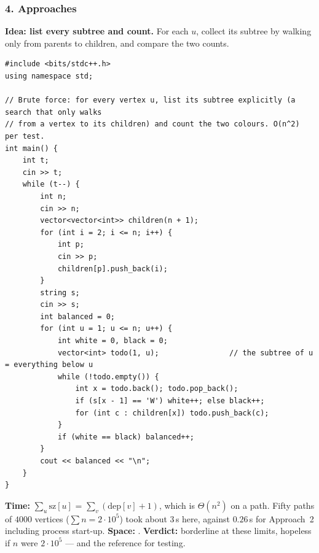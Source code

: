 \subsubsection*{4. Approaches}

\begin{bruteforcebox}
\textbf{Idea: list every subtree and count.} For each $u$, collect its subtree by walking only from parents to children, and compare the two counts.

\begin{lstlisting}[style=cpp]
#include <bits/stdc++.h>
using namespace std;

// Brute force: for every vertex u, list its subtree explicitly (a search that only walks
// from a vertex to its children) and count the two colours. O(n^2) per test.
int main() {
    int t;
    cin >> t;
    while (t--) {
        int n;
        cin >> n;
        vector<vector<int>> children(n + 1);
        for (int i = 2; i <= n; i++) {
            int p;
            cin >> p;
            children[p].push_back(i);
        }
        string s;
        cin >> s;
        int balanced = 0;
        for (int u = 1; u <= n; u++) {
            int white = 0, black = 0;
            vector<int> todo(1, u);                // the subtree of u = everything below u
            while (!todo.empty()) {
                int x = todo.back(); todo.pop_back();
                if (s[x - 1] == 'W') white++; else black++;
                for (int c : children[x]) todo.push_back(c);
            }
            if (white == black) balanced++;
        }
        cout << balanced << "\n";
    }
}
\end{lstlisting}

\begin{complexitybox}
\textbf{Time:} $\sum_u \mathrm{sz}[u]$ = $\sum_v (\mathrm{dep}[v] + 1)$, which is $\Theta(n^2)$ on a path. Fifty paths of $4000$ vertices ($\sum n = 2\cdot10^5$) took about 3\,s here, against $0.26$\,s for Approach~2 including process start-up. \textbf{Space:} . \textbf{Verdict:} borderline at these limits, hopeless if $n$ were $2\cdot10^5$ --- and the reference for testing.
\end{complexitybox}
\end{bruteforcebox}

